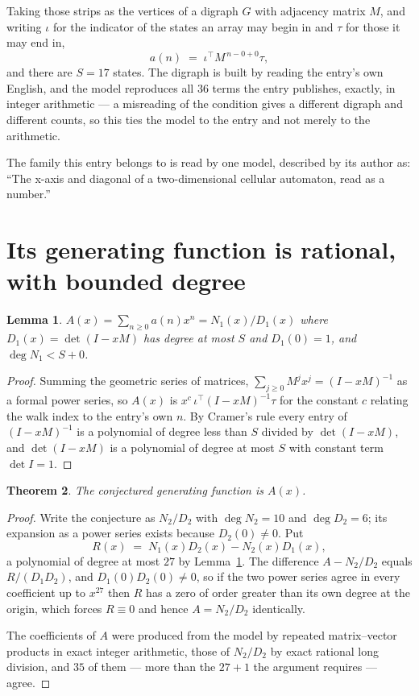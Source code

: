 \documentclass[11pt,a4paper]{article}
\theoremstyle{plain}
\newtheorem{theorem}{Theorem}
\newtheorem{lemma}[theorem]{Lemma}
\theoremstyle{definition}
\begin{document}
Taking those strips as the vertices of a digraph $G$ with adjacency matrix $M$, and writing
$\iota$ for the indicator of the states an array may begin in and $\tau$ for those it may end
in,
\[
a(n)\;=\;\iota^{\!\top}M^{\,n-0+0}\tau ,
\]
and there are $S=17$ states. The digraph is built by reading the entry's own English, and the
model reproduces all $36$ terms the entry publishes, exactly, in integer arithmetic --- a
misreading of the condition gives a different digraph and different counts, so this ties the
model to the entry and not merely to the arithmetic.

The family this entry belongs to is read by one model, described by its author as: ``The x-axis and diagonal of a two-dimensional cellular automaton, read as a number.''


\section{Its generating function is rational, with bounded degree}

\begin{lemma}\label{lem:rat}
$A(x)=\sum_{n\ge0}a(n)x^n=N_1(x)/D_1(x)$ where $D_1(x)=\det(I-xM)$ has degree at most
$S$ and $D_1(0)=1$, and $\deg N_1<S+0$.
\end{lemma}

\begin{proof}
Summing the geometric series of matrices, $\sum_{j\ge0}M^jx^j=(I-xM)^{-1}$ as a formal
power series, so $A(x)$ is $x^{c}\,\iota^{\!\top}(I-xM)^{-1}\tau$ for the constant $c$
relating the walk index to the entry's own $n$. By Cramer's rule every entry of
$(I-xM)^{-1}$ is a polynomial of degree less than $S$ divided by $\det(I-xM)$, and
$\det(I-xM)$ is a polynomial of degree at most $S$ with constant term $\det I=1$.
\end{proof}

\begin{theorem}
The conjectured generating function is $A(x)$.
\end{theorem}

\begin{proof}
Write the conjecture as $N_2/D_2$ with $\deg N_2=10$ and $\deg D_2=6$; its expansion as a
power series exists because $D_2(0)\neq0$. Put
\[
R(x)\;=\;N_1(x)D_2(x)-N_2(x)D_1(x),
\]
a polynomial of degree at most $27$ by Lemma~\ref{lem:rat}. The difference
$A-N_2/D_2$ equals $R/(D_1D_2)$, and $D_1(0)D_2(0)\neq0$, so if the two power series agree in
every coefficient up to $x^{27}$ then $R$ has a zero of order greater than its own
degree at the origin, which forces $R\equiv0$ and hence $A=N_2/D_2$ identically.

The coefficients of $A$ were produced from the model by repeated matrix--vector products in
exact integer arithmetic, those of $N_2/D_2$ by exact rational long division, and $35$
of them --- more than the $27+1$ the argument requires --- agree.
\end{proof}
\end{document}
